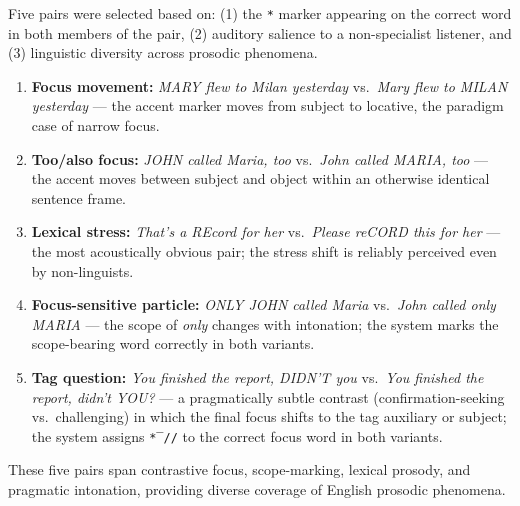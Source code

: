 Five pairs were selected based on: (1) the \texttt{*} marker appearing on
the correct word in both members of the pair, (2) auditory salience to a
non-specialist listener, and (3) linguistic diversity across prosodic
phenomena.

\begin{enumerate}
\item \textbf{Focus movement:} \textit{MARY flew to Milan yesterday}
      vs.\ \textit{Mary flew to MILAN yesterday} --- the accent marker moves
      from subject to locative, the paradigm case of narrow focus.
\item \textbf{Too/also focus:} \textit{JOHN called Maria, too}
      vs.\ \textit{John called MARIA, too} --- the accent moves between
      subject and object within an otherwise identical sentence frame.
\item \textbf{Lexical stress:} \textit{That's a REcord for her}
      vs.\ \textit{Please reCORD this for her} --- the most acoustically
      obvious pair; the stress shift is reliably perceived even by
      non-linguists.
\item \textbf{Focus-sensitive particle:} \textit{ONLY JOHN called Maria}
      vs.\ \textit{John called only MARIA} --- the scope of \textit{only}
      changes with intonation; the system marks the scope-bearing word
      correctly in both variants.
\item \textbf{Tag question:} \textit{You finished the report, DIDN'T you}
      vs.\ \textit{You finished the report, didn't YOU?} --- a pragmatically
      subtle contrast (confirmation-seeking vs.\ challenging) in which the
      final focus shifts to the tag auxiliary or subject; the system assigns
      \texttt{*‾//} to the correct focus word in both variants.
\end{enumerate}

These five pairs span contrastive focus, scope-marking, lexical prosody, and
pragmatic intonation, providing diverse coverage of English prosodic phenomena.

